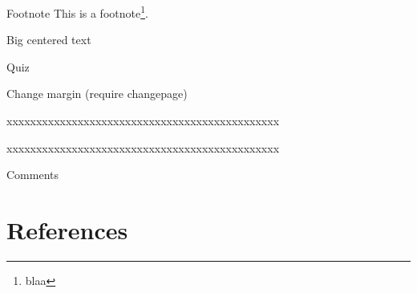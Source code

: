 \documentclass[table]{beamer}
\begin{document}
\begin{frame}[label={sec:org27355ff}]{Footnote}
This is a footnote\footnote{blaa}.
\end{frame}
\begin{frame}[label={sec:orgcf3fde2}]{Big centered text}
\vfill

\begin{center}
\Huge Quiz
\end{center}

\vfill
\end{frame}

\begin{frame}[label={sec:orgf0fbbab}]{Change margin}
(require changepage)
\begin{adjustwidth}{-1em}{-1em}
xxxxxxxxxxxxxxxxxxxxxxxxxxxxxxxxxxxxxxxxxxxxxx
\end{adjustwidth}
\begin{adjustwidth}{-3em}{-3em}
xxxxxxxxxxxxxxxxxxxxxxxxxxxxxxxxxxxxxxxxxxxxxx
\end{adjustwidth}
\end{frame}

\begin{frame}[label={sec:org6041882}]{Comments}
\end{frame}
\section{References}
\label{sec:org867bc6e}
\begingroup
\renewcommand{\section}[2]{}



\endgroup
\end{document}
